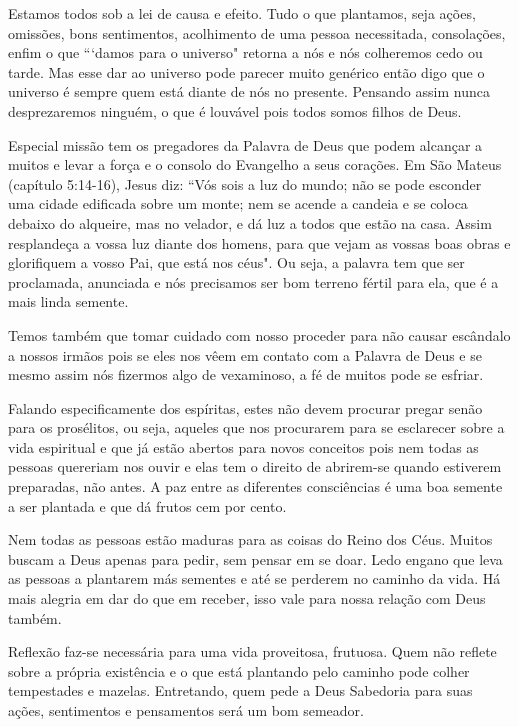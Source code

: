 \emdash{}Estamos todos sob a lei de causa e efeito. Tudo o que plantamos, seja ações, omissões, bons sentimentos, acolhimento de uma pessoa necessitada, consolações, enfim o que ```damos para o universo" retorna a nós e nós colheremos cedo ou tarde. Mas esse dar ao universo pode parecer muito genérico então digo que o universo é sempre quem está diante de nós no presente. Pensando assim nunca desprezaremos ninguém, o que é louvável pois todos somos filhos de Deus.

\emdash{}Especial missão tem os pregadores da Palavra de Deus que podem alcançar a muitos e levar a força e o consolo do Evangelho a seus corações. Em São Mateus (capítulo 5:14-16), Jesus diz: ``Vós sois a luz do mundo; não se pode esconder uma cidade edificada sobre um monte; nem se acende a candeia e se coloca debaixo do alqueire, mas no velador, e dá luz a todos que estão na casa. Assim resplandeça a vossa luz diante dos homens, para que vejam as vossas boas obras e glorifiquem a vosso Pai, que está nos céus". Ou seja, a palavra tem que ser proclamada, anunciada e nós precisamos ser bom terreno fértil para ela, que é a mais linda semente.

\emdash{}Temos também que tomar cuidado com nosso proceder para não causar escândalo a nossos irmãos pois se eles nos vêem em contato com a Palavra de Deus e se mesmo assim nós fizermos algo de vexaminoso, a fé de muitos pode se esfriar. 

\emdash{}Falando especificamente dos espíritas, estes não devem procurar pregar senão para os prosélitos, ou seja, aqueles que nos procurarem para se esclarecer sobre a vida espiritual e que já estão abertos para novos conceitos pois nem todas as pessoas quereriam nos ouvir e elas tem o direito de abrirem-se quando estiverem preparadas, não antes. A paz entre as diferentes consciências é uma boa semente a ser plantada e que dá frutos cem por cento.

\emdash{}Nem todas as pessoas estão maduras para as coisas do Reino dos Céus. Muitos buscam a Deus apenas para pedir, sem pensar em se doar. Ledo engano que leva as pessoas a plantarem más sementes e até se perderem no caminho da vida. Há mais alegria em dar do que em receber, isso vale para nossa relação com Deus também.

\emdash{}Reflexão faz-se necessária para uma vida proveitosa, frutuosa. Quem não reflete sobre a própria existência e o que está plantando pelo caminho pode colher tempestades e mazelas. Entretando, quem pede a Deus Sabedoria para suas ações, sentimentos e pensamentos será um bom semeador.


